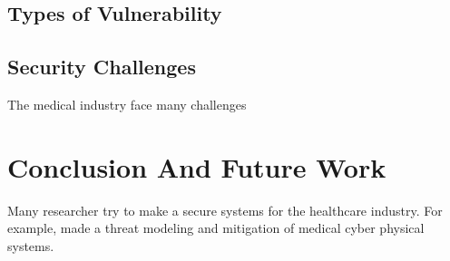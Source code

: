 \documentclass[pdf,bookmarks,colorlinks=true]{IEEEtran}
\begin{document}
\subsection{Types of Vulnerability}

\subsection{Security Challenges}
The medical industry face many challenges 

\section{Conclusion And Future Work}
\label{sec:Conclusion}

Many researcher try to make a secure systems for the healthcare industry. For example, \cite{Almohri:2017:TMM:3204094.3204113} made a threat modeling and mitigation of medical cyber physical systems. 





\end{document}
